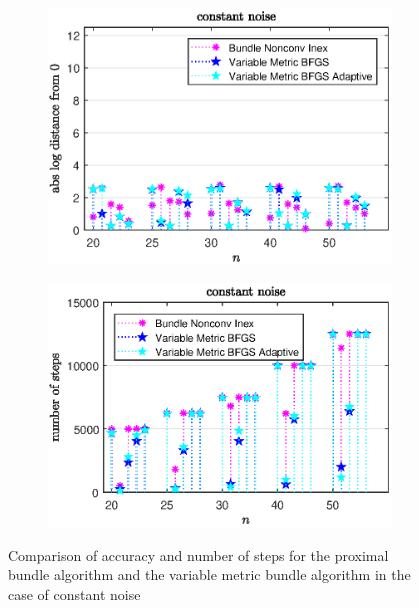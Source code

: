 \vspace{-1.5em}

\begin{figure}[H]
	\begin{subfigure}{0.49\textwidth}
		\includegraphics[width=\textwidth]{Pictures/Plots/constant_noise_b.eps}%
	\end{subfigure}
	\begin{subfigure}{0.49\textwidth}
		\includegraphics[width=\textwidth]{Pictures/Plots/steps_constant_noise_b.eps}%
	\end{subfigure}
	\vspace{-.5em}
	\caption{Comparison of accuracy and number of steps for the proximal bundle algorithm and the variable metric bundle algorithm in the case of constant noise}%
	\label{fig_const_noise_large}%
\end{figure}

